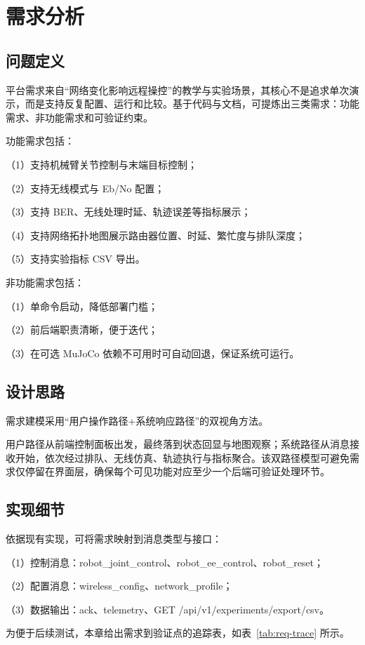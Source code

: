 
\section{需求分析}

\subsection{问题定义}
平台需求来自“网络变化影响远程操控”的教学与实验场景，其核心不是追求单次演示，而是支持反复配置、运行和比较。基于代码与文档，可提炼出三类需求：功能需求、非功能需求和可验证约束。

功能需求包括：

（1）支持机械臂关节控制与末端目标控制；

（2）支持无线模式与 Eb/No 配置；

（3）支持 BER、无线处理时延、轨迹误差等指标展示；

（4）支持网络拓扑地图展示路由器位置、时延、繁忙度与排队深度；

（5）支持实验指标 CSV 导出。

非功能需求包括：

（1）单命令启动，降低部署门槛；

（2）前后端职责清晰，便于迭代；

（3）在可选 MuJoCo 依赖不可用时可自动回退，保证系统可运行。

\subsection{设计思路}
需求建模采用“用户操作路径+系统响应路径”的双视角方法。

用户路径从前端控制面板出发，最终落到状态回显与地图观察；系统路径从消息接收开始，依次经过排队、无线仿真、轨迹执行与指标聚合。该双路径模型可避免需求仅停留在界面层，确保每个可见功能对应至少一个后端可验证处理环节。

\subsection{实现细节}
依据现有实现，可将需求映射到消息类型与接口：

（1）控制消息：robot\_joint\_control、robot\_ee\_control、robot\_reset；

（2）配置消息：wireless\_config、network\_profile；

（3）数据输出：ack、telemetry、GET /api/v1/experiments/export/csv。

为便于后续测试，本章给出需求到验证点的追踪表，如表~\ref{tab:req-trace} 所示。


